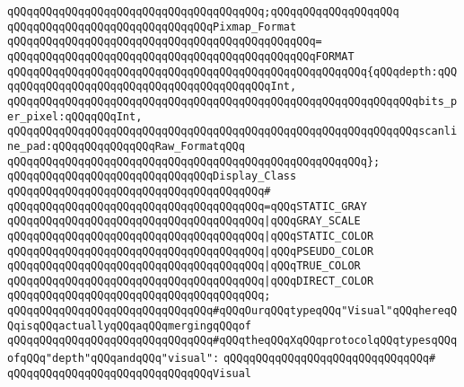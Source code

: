 \verb|qQQqqQQqqQQqqQQqqQQqqQQqqQQqqQQqqQQqqQQq;qQQqqQQqqQQqqQQqqQQq|\newline
\newline
\verb|qQQqqQQqqQQqqQQqqQQqqQQqqQQqqQQqPixmap_Format|\newline
\verb|qQQqqQQqqQQqqQQqqQQqqQQqqQQqqQQqqQQqqQQqqQQqqQQq=|\newline
\verb|qQQqqQQqqQQqqQQqqQQqqQQqqQQqqQQqqQQqqQQqqQQqqQQqFORMAT|\newline
\verb|qQQqqQQqqQQqqQQqqQQqqQQqqQQqqQQqqQQqqQQqqQQqqQQqqQQqqQQq{qQQqdepth:qQQqqQQqqQQqqQQqqQQqqQQqqQQqqQQqqQQqqQQqqQQqInt,|\newline
\verb|qQQqqQQqqQQqqQQqqQQqqQQqqQQqqQQqqQQqqQQqqQQqqQQqqQQqqQQqqQQqqQQqbits_per_pixel:qQQqqQQqInt,|\newline
\verb|qQQqqQQqqQQqqQQqqQQqqQQqqQQqqQQqqQQqqQQqqQQqqQQqqQQqqQQqqQQqqQQqscanline_pad:qQQqqQQqqQQqqQQqRaw_FormatqQQq|\newline
\verb|qQQqqQQqqQQqqQQqqQQqqQQqqQQqqQQqqQQqqQQqqQQqqQQqqQQqqQQq};|\newline
\newline
\verb|qQQqqQQqqQQqqQQqqQQqqQQqqQQqqQQqDisplay_Class|\newline
\verb|qQQqqQQqqQQqqQQqqQQqqQQqqQQqqQQqqQQqqQQq#|\newline
\verb|qQQqqQQqqQQqqQQqqQQqqQQqqQQqqQQqqQQqqQQq=qQQqSTATIC_GRAY|\newline
\verb|qQQqqQQqqQQqqQQqqQQqqQQqqQQqqQQqqQQqqQQq|\verb#|qQQqGRAY_SCALE#\newline
\verb|qQQqqQQqqQQqqQQqqQQqqQQqqQQqqQQqqQQqqQQq|\verb#|qQQqSTATIC_COLOR#\newline
\verb|qQQqqQQqqQQqqQQqqQQqqQQqqQQqqQQqqQQqqQQq|\verb#|qQQqPSEUDO_COLOR#\newline
\verb|qQQqqQQqqQQqqQQqqQQqqQQqqQQqqQQqqQQqqQQq|\verb#|qQQqTRUE_COLOR#\newline
\verb|qQQqqQQqqQQqqQQqqQQqqQQqqQQqqQQqqQQqqQQq|\verb#|qQQqDIRECT_COLOR#\newline
\verb|qQQqqQQqqQQqqQQqqQQqqQQqqQQqqQQqqQQqqQQq;|\newline
\newline
\verb|qQQqqQQqqQQqqQQqqQQqqQQqqQQqqQQq#qQQqOurqQQqtypeqQQq"Visual"qQQqhereqQQqisqQQqactuallyqQQqaqQQqmergingqQQqof|\newline
\verb|qQQqqQQqqQQqqQQqqQQqqQQqqQQqqQQq#qQQqtheqQQqXqQQqprotocolqQQqtypesqQQqofqQQq"depth"qQQqandqQQq"visual":|\newline
\verb|qQQqqQQqqQQqqQQqqQQqqQQqqQQqqQQq#|\newline
\verb|qQQqqQQqqQQqqQQqqQQqqQQqqQQqqQQqVisual|\newline
